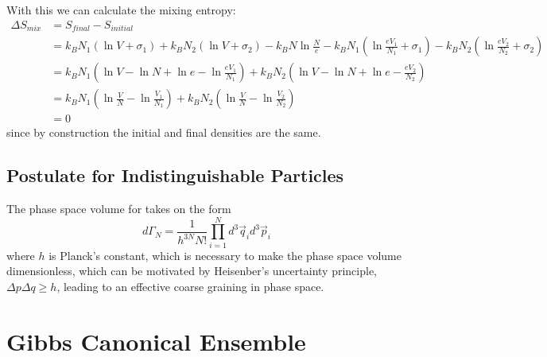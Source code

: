 \documentclass[12pt, a4paper, oneside, openright, titlepage]{book}
\begin{document}
With this we can calculate the mixing entropy: \begin{align*}
    \Delta S_{mix} &= S_{final} - S_{initial} \\
    &= k_BN_1(\ln V + \sigma_1) + k_BN_2(\ln V+\sigma_2) - k_BN\ln\frac{N}{e} - k_BN_1\left(\ln\frac{eV_1}{N_1}+\sigma_1\right)-k_BN_2\left(\ln\frac{eV_2}{N_2}+\sigma_2\right) \\
    &= k_BN_1\left(\ln V - \ln N + \ln e - \ln\frac{eV_1}{N_1}\right) + k_BN_2\left(\ln V - \ln N + \ln e - \frac{eV_2}{N_2}\right) \\
    &= k_BN_1\left(\ln\frac{V}{N}-\ln\frac{V_1}{N_1}\right) + k_BN_2\left(\ln\frac{V}{N} - \ln\frac{V_2}{N_2}\right) \\
    &= 0
\end{align*}
since by construction the initial and final densities are the same.

\subsection{Postulate for Indistinguishable Particles}

\begin{cust}
    The phase space volume for  takes on the form \begin{equation*}
        d\Gamma_N = \frac{1}{h^{3N}N!}\prod_{i=1}^Nd^3\vec{q}_id^3\vec{p}_i
    \end{equation*}
    where $h$ is Planck's constant, which is necessary to make the phase space volume dimensionless, which can be motivated by Heisenber's uncertainty principle, $\Delta p\Delta q \geq h$, leading to an effective coarse graining in phase space.
\end{cust}



\section{Gibbs Canonical Ensemble}
\end{document}
